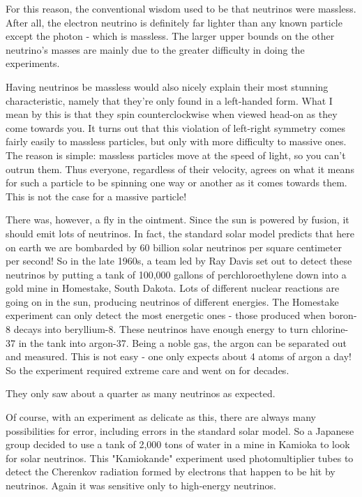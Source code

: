For this reason, the conventional wisdom used to be that neutrinos were
massless.  After all, the electron neutrino is definitely far lighter
than any known particle except the photon - which is massless.   The
larger upper bounds on the other neutrino's masses are mainly due to 
the greater difficulty in doing the experiments.  

Having neutrinos be massless would also nicely explain their most
stunning characteristic, namely that they're only found in a left-handed
form.  What I mean by this is that they spin counterclockwise when
viewed head-on as they come towards you.  It turns out that this
violation of left-right symmetry comes fairly easily to massless
particles, but only with more difficulty to massive ones.  The reason is
simple: massless particles move at the speed of light, so you can't
outrun them.  Thus everyone, regardless of their velocity, agrees on
what it means for such a particle to be spinning one way or another as
it comes towards them.  This is not the case for a massive particle!

There was, however, a fly in the ointment.  Since the sun is powered by
fusion, it should emit lots of neutrinos.   In fact, the standard solar
model predicts that here on earth we are bombarded by 60 billion solar
neutrinos per square centimeter per second!  So in the late 1960s, a
team led by Ray Davis set out to detect these neutrinos by putting a
tank of 100,000 gallons of perchloroethylene down into a gold mine in
Homestake, South Dakota.  Lots of different nuclear reactions are going
on in the sun, producing neutrinos of different energies.  The Homestake
experiment can only detect the most energetic ones - those produced when
boron-8 decays into beryllium-8.  These neutrinos have enough energy to
turn chlorine-37 in the tank into argon-37.  Being a noble gas, the
argon can be separated out and measured.  This is not easy - one only
expects about 4 atoms of argon a day!  So the experiment required
extreme care and went on for decades.  

They only saw about a quarter as many neutrinos as expected.  

Of course, with an experiment as delicate as this, there are always many
possibilities for error, including errors in the standard solar model. 
So a Japanese group decided to use a tank of 2,000 tons of water  in a
mine in Kamioka to look for solar neutrinos.  This "Kamiokande"
experiment used photomultiplier tubes to detect the Cherenkov radiation 
formed by electrons that happen to be hit by neutrinos.  Again it was
sensitive only to high-energy neutrinos.  

